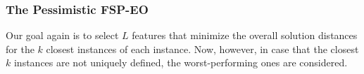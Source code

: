 \documentclass[11pt, a4paper]{article}
\newcommand{\fspeo}{FSP-EO\xspace}
\newcommand{\X}{{\mathcal{X}}} %
\begin{document}
\subsubsection{The Pessimistic \fspeo}
Our goal again is to select $L$ features that minimize the overall solution distances for the $k$ closest instances of each instance. Now, however, in case that the closest $k$ instances are not uniquely defined, the worst-performing ones are considered. %
\end{document}
